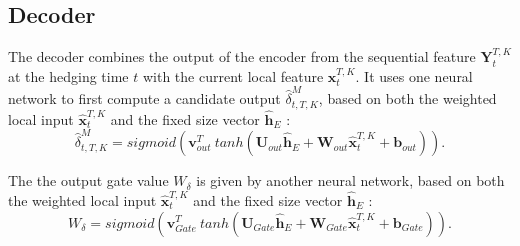\documentclass[letterpaper,12pt,titlepage,oneside,final]{book}
\numberwithin{equation}{section}
\theoremstyle{definition}
\newcommand{\vb}{\mathbf{b}}
\newcommand{\vx}{\mathbf{x}}
\newcommand{\vv}{\mathbf{v}}
\newcommand{\vW}{\pmb{W}}
\newcommand{\vU}{\pmb{U}}
\begin{document}
\subsection{Decoder}

The decoder combines the output of the encoder from the sequential feature $\mathbf{Y}_{t}^{T,K}$  at the hedging time $t$ with the current local feature $\mathbf{x}_{t}^{T,K}$.
It uses one neural network to first compute a candidate output  $\widehat{\delta}^M_{t,T,K}$,  based on both the weighted local input  $\widehat{\vx}_{t}^{T,K}$ and the fixed size vector $\mathbf{\widehat{h}}_E$ :
$$
\widehat{\delta}^M_{t,T,K}=sigmoid (\vv^T_{out} \ tanh( \vU_{out} \mathbf{\widehat{h}}_E + \vW_{out} \widehat{\vx}_{t}^{T,K}+ \vb_{out})).
$$

The the output gate value $W_{\delta}$ is given by another neural network, based on both the weighted local input  $\widehat{\vx}_{t}^{T,K}$ and the fixed size vector $\mathbf{\widehat{h}}_E$ :
\begin{equation}\label{WDel}
W_{\delta}=sigmoid (\vv^T_{Gate} \ tanh( \vU_{Gate} \mathbf{\widehat{h}}_E + \vW_{Gate} \widehat{\vx}_{t}^{T,K}+ \vb_{Gate})).
\end{equation}
\end{document}
